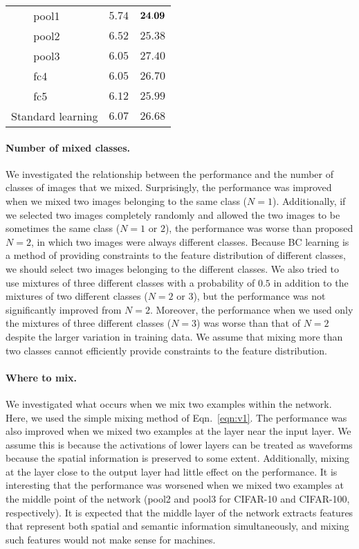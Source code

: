 \documentclass[10pt,twocolumn,letterpaper]{article}
\begin{document}
\begin{table}
\begin{tabular}{llcc}
								& pool1 		        & $5.74$ & ${\bf 24.09} $ \\
								& pool2 			& $6.52$ & $25.38 $ \\
								& pool3 			& $6.05$ & $27.40 $ \\
								& fc4 			& $6.05$ & $26.70 $ \\
								& fc5				& $6.12$ & $25.99 $ \\
		\midrule
		\midrule
		\multicolumn{2}{c}{Standard learning} & $6.07$ & $26.68$ \\
		\bottomrule
	\end{tabular}
	\vspace{-3mm}
\end{table}

\paragraph{Number of mixed classes.}
We investigated the relationship between the performance and the number of classes of images that we mixed. Surprisingly, the performance was improved when we mixed two images belonging to the same class ($N=1$). Additionally, if we selected two images completely randomly and allowed the two images to be sometimes the same class ($N=1$ or $2$), the performance was worse than proposed $N=2$, in which two images were always different classes. Because BC learning is a method of providing constraints to the feature distribution of different classes, we should select two images belonging to the different classes. We also tried to use mixtures of three different classes with a probability of $0.5$ in addition to the mixtures of two different classes ($N=2$ or $3$), but the performance was not significantly improved from $N=2$. Moreover, the performance when we used only the mixtures of three different classes ($N=3$) was worse than that of $N=2$ despite the larger variation in training data. We assume that mixing more than two classes cannot efficiently provide constraints to the feature distribution.

\paragraph{Where to mix.}
We investigated what occurs when we mix two examples within the network. Here, we used the simple mixing method of Eqn.~\ref{eqn:v1}. The performance was also improved when we mixed two examples at the layer near the input layer. We assume this is because the activations of lower layers can be treated as waveforms because the spatial information is preserved to some extent. Additionally, mixing at the layer close to the output layer had little effect on the performance. It is interesting that the performance was worsened when we mixed two examples at the middle point of the network (pool2 and pool3 for CIFAR-10 and CIFAR-100, respectively). It is expected that the middle layer of the network extracts features that represent both spatial and semantic information simultaneously, and mixing such features would not make sense for machines.
\end{document}
